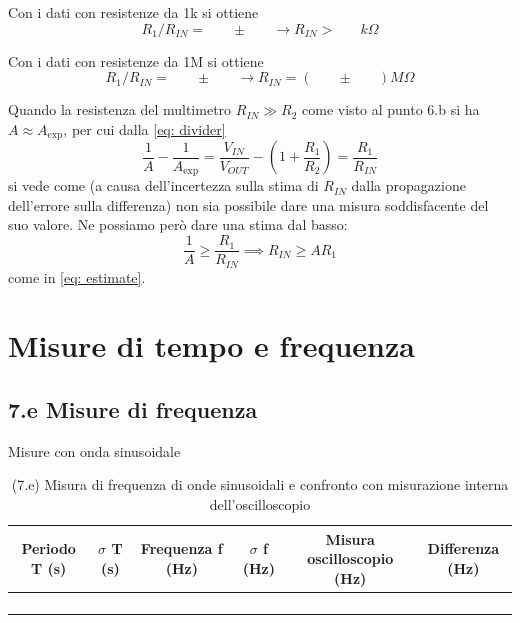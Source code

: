 \documentclass[10pt,a4paper]{article}
\newcommand{\exn}{\phantom{xxx}}
\begin{document}
Con i dati con resistenze da 1k si ottiene
\begin{equation}\label{eq: estimate}
R_1/R_{IN} = \exn  \pm  \exn   \rightarrow  R_{IN} > \exn k\Omega
\end{equation}


Con i dati con resistenze da 1M si ottiene
\[ R_1/R_{IN} = \exn  \pm  \exn   \rightarrow  R_{IN} = (\exn \pm  \exn)  M\Omega
\]

Quando la resistenza del multimetro $R_{IN} \gg R_2$ come visto al punto
6.b si ha $A \approx A_{\exp}$, per cui dalla \eqref{eq: divider}
\[
\frac{1}{A} - \frac{1}{A_{\exp}} = \frac{V_{IN}}{V_{OUT}} -
(1 +  \frac{R_1}{R_2}) = \frac{R_1}{R_{IN}}
\]
si vede come (a causa dell'incertezza sulla stima di $R_{IN}$ dalla
propagazione dell'errore sulla differenza) non sia possibile dare una misura
soddisfacente del suo valore. Ne possiamo però dare una stima dal basso:
\[
\frac{1}{A} \geq \frac{R_1}{R_{IN}} \implies R_{IN} \geq A R_1
\]
come in \eqref{eq: estimate}.

\section{Misure di tempo e frequenza}

\subsection*{7.e Misure di frequenza}
Misure con onda sinusoidale
\begin{table}[h]
\centering
\begin{tabular}{|c|c|c|c|c|c|}
\hline 
Periodo T (s)& $\sigma$ T (s)  &Frequenza f (Hz) & $\sigma$ f (Hz) &
Misura oscilloscopio (Hz) & Differenza (Hz)\\
\hline 
\exn & \exn & \exn & \exn & \exn &\exn \\
\exn & \exn & \exn & \exn & \exn &\exn \\
\exn & \exn & \exn & \exn & \exn &\exn \\
\exn & \exn & \exn & \exn & \exn &\exn \\
\hline 
\end{tabular} 
\caption{(7.e) Misura di frequenza di onde sinusoidali e confronto con
misurazione interna dell'oscilloscopio }
\end{table}
\end{document}
